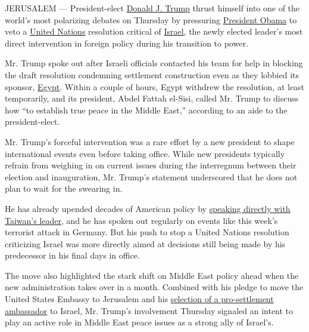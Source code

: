 JERUSALEM --- President-elect
\href{http://www.nytimes3xbfgragh.onion/topic/person/donald-trump?inline=nyt-per}{Donald
J. Trump} thrust himself into one of the world's most polarizing debates
on Thursday by pressuring
\href{http://topics.nytimes3xbfgragh.onion/top/reference/timestopics/people/o/barack_obama/index.html?inline=nyt-per}{President
Obama} to veto a
\href{http://topics.nytimes3xbfgragh.onion/top/reference/timestopics/organizations/u/united_nations/index.html?inline=nyt-org}{United
Nations} resolution critical of
\href{http://www.nytimes3xbfgragh.onion/topic/destination/israel}{Israel},
the newly elected leader's most direct intervention in foreign policy
during his transition to power.

Mr. Trump spoke out after Israeli officials contacted his team for help
in blocking the draft resolution condemning settlement construction even
as they lobbied its sponsor,
\href{http://www.nytimes3xbfgragh.onion/topic/destination/egypt}{Egypt}.
Within a couple of hours, Egypt withdrew the resolution, at least
temporarily, and its president, Abdel Fattah el-Sisi, called Mr. Trump
to discuss how ``to establish true peace in the Middle East,'' according
to an aide to the president-elect.

Mr. Trump's forceful intervention was a rare effort by a new president
to shape international events even before taking office. While new
presidents typically refrain from weighing in on current issues during
the interregnum between their election and inauguration, Mr. Trump's
statement underscored that he does not plan to wait for the swearing in.

He has already upended decades of American policy by
\href{http://www.nytimes3xbfgragh.onion/2016/12/02/us/politics/trump-speaks-with-taiwans-leader-a-possible-affront-to-china.html?_r=0}{speaking
directly with Taiwan's leader}, and he has spoken out regularly on
events like this week's terrorist attack in Germany. But his push to
stop a United Nations resolution criticizing Israel was more directly
aimed at decisions still being made by his predecessor in his final days
in office.

The move also highlighted the stark shift on Middle East policy ahead
when the new administration takes over in a month. Combined with his
pledge to move the United States Embassy to Jerusalem and his
\href{http://www.nytimes3xbfgragh.onion/2016/12/15/us/politics/donald-trump-david-friedman-israel-ambassador.html}{selection
of a pro-settlement ambassador} to Israel, Mr. Trump's involvement
Thursday signaled an intent to play an active role in Middle East peace
issues as a strong ally of Israel's.

